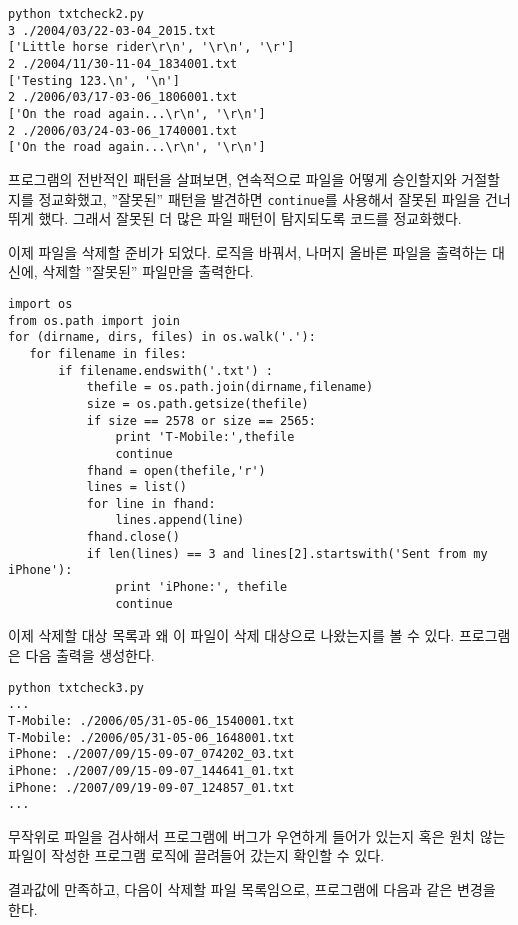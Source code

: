\beforeverb
\begin{verbatim}
python txtcheck2.py 
3 ./2004/03/22-03-04_2015.txt
['Little horse rider\r\n', '\r\n', '\r']
2 ./2004/11/30-11-04_1834001.txt
['Testing 123.\n', '\n']
2 ./2006/03/17-03-06_1806001.txt
['On the road again...\r\n', '\r\n']
2 ./2006/03/24-03-06_1740001.txt
['On the road again...\r\n', '\r\n']
\end{verbatim}
\afterverb
%

프로그램의 전반적인 패턴을 살펴보면, 연속적으로 파일을 어떻게 승인할지와 거절할지를 정교화했고,
''잘못된'' 패턴을 발견하면 {\tt continue}를 사용해서 잘못된 파일을 건너뛰게 했다.
그래서 잘못된 더 많은 파일 패턴이 탐지되도록 코드를 정교화했다.

이제 파일을 삭제할 준비가 되었다. 로직을 바꿔서, 나머지 올바른 파일을 출력하는 대신에,
삭제할 ''잘못된'' 파일만을 출력한다.

\beforeverb
\begin{verbatim}
import os
from os.path import join
for (dirname, dirs, files) in os.walk('.'):
   for filename in files:
       if filename.endswith('.txt') :
           thefile = os.path.join(dirname,filename)
           size = os.path.getsize(thefile)
           if size == 2578 or size == 2565:
               print 'T-Mobile:',thefile
               continue
           fhand = open(thefile,'r')
           lines = list()
           for line in fhand:
               lines.append(line)
           fhand.close()
           if len(lines) == 3 and lines[2].startswith('Sent from my iPhone'):
               print 'iPhone:', thefile
               continue
\end{verbatim}
\afterverb
%

이제 삭제할 대상 목록과 왜 이 파일이 삭제 대상으로 나왔는지를 볼 수 있다.
프로그램은 다음 출력을 생성한다.

\beforeverb
\begin{verbatim}
python txtcheck3.py
...
T-Mobile: ./2006/05/31-05-06_1540001.txt
T-Mobile: ./2006/05/31-05-06_1648001.txt
iPhone: ./2007/09/15-09-07_074202_03.txt
iPhone: ./2007/09/15-09-07_144641_01.txt
iPhone: ./2007/09/19-09-07_124857_01.txt
...
\end{verbatim}
\afterverb
%

무작위로 파일을 검사해서 프로그램에 버그가 우연하게 들어가 있는지 혹은 원치 않는 파일이 
작성한 프로그램 로직에 끌려들어 갔는지 확인할 수 있다.

결과값에 만족하고, 다음이 삭제할 파일 목록임으로, 프로그램에 다음과 같은 변경을 한다.

